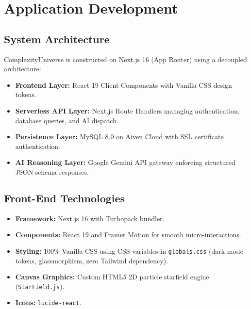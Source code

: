 \documentclass[12pt,a4paper]{report}
\DeclareRobustCommand{\_}{\textunderscore\allowbreak}
\begin{document}
\chapter{Application Development}

\section{System Architecture}
ComplexityUniverse is constructed on Next.js 16 (App Router) using a decoupled architecture:
\begin{itemize}
    \item \textbf{Frontend Layer:} React 19 Client Components with Vanilla CSS design tokens.
    \item \textbf{Serverless API Layer:} Next.js Route Handlers managing authentication, database queries, and AI dispatch.
    \item \textbf{Persistence Layer:} MySQL 8.0 on Aiven Cloud with SSL certificate authentication.
    \item \textbf{AI Reasoning Layer:} Google Gemini API gateway enforcing structured JSON schema responses.
\end{itemize}

\section{Front-End Technologies}
\begin{itemize}
    \item \textbf{Framework:} Next.js 16 with Turbopack bundler.
    \item \textbf{Components:} React 19 and Framer Motion for smooth micro-interactions.
    \item \textbf{Styling:} 100\% Vanilla CSS using CSS variables in \texttt{globals.css} (dark-mode tokens, glassmorphism, zero Tailwind dependency).
    \item \textbf{Canvas Graphics:} Custom HTML5 2D particle starfield engine (\texttt{StarField.js}).
    \item \textbf{Icons:} \texttt{lucide-react}.
\end{itemize}
\end{document}
